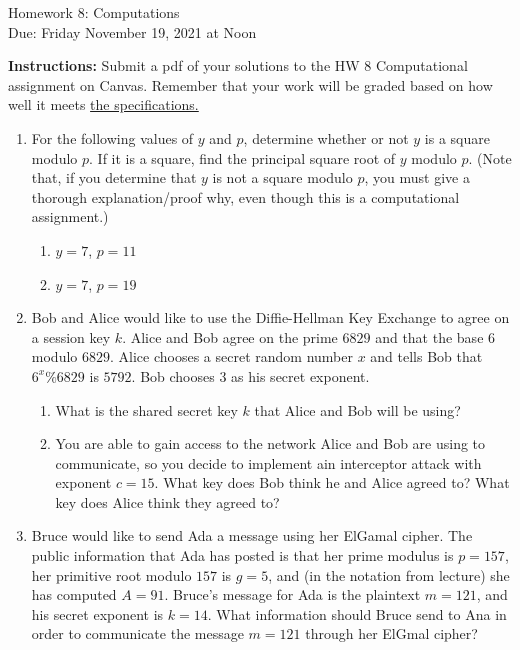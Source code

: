 \documentclass[10pt,a4paper]{article}
\begin{document}
\begin{center}
{\Large Homework 8: Computations}\\
Due: Friday November 19, 2021 at Noon\\


\end{center}
{\bf Instructions:} Submit a pdf of your solutions to the HW 8 Computational assignment on Canvas. Remember that your work will be graded based on how well it meets \href{https://docs.google.com/document/d/1emM06_WRh_h941rsjtRE9fRVndJtfRKd9gyS3Fs_rFA/edit?usp=sharing}{the specifications. }


\begin{enumerate}
 \item For the following values of $y$ and $p$, determine whether or not $y$ is a square modulo $p$.  If it is a square, find the principal square root of $y$ modulo $p$. (Note that, if you determine that $y$ is not a square modulo $p$, you must give a thorough explanation/proof why, even though this is a computational assignment.) \begin{enumerate}
\item $y=7$, $p=11$
\item $y=7$, $p=19$
 \end{enumerate}


\item  Bob and Alice would like to use the Diffie-Hellman Key Exchange to agree on a session key $k$. Alice and Bob agree on the prime $6829$ and that the base $6$ modulo $6829$. Alice chooses a secret random number $x$ and tells Bob that $6^x\%6829$ is $5792$. Bob chooses $3$ as his secret exponent. 
\begin{enumerate}
\item What is the shared secret key $k$ that Alice and Bob will be using?
\item You are able to gain access to the network Alice and Bob are using to communicate, so you decide to implement ain interceptor attack with exponent $c=15$. What key does Bob think he and Alice agreed to? What key does Alice think they agreed to?
\end{enumerate}	
\item Bruce would like to send Ada a message using her ElGamal cipher.  The public information that Ada has posted is that her prime modulus is $p = 157$, her primitive root modulo $157$ is $g = 5$, and (in the notation from lecture) she has computed $A = 91$.  Bruce's message for Ada is the plaintext $m = 121$, and his secret exponent is $k = 14$.  What information should Bruce send to Ana in order to communicate the message $m = 121$ through her ElGmal cipher?  
\end{enumerate}
\end{document}
